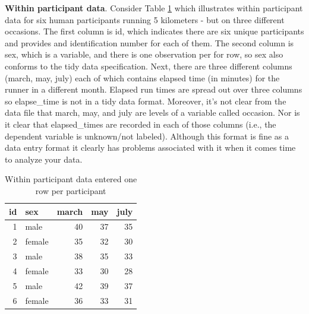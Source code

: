 \documentclass[
]{krantz}
\begin{document}
\textbf{Within participant data}. Consider Table \ref{tab:withinex} which illustrates within participant data for six human participants running 5 kilometers - but on three different occasions. The first column is id, which indicates there are six unique participants and provides and identification number for each of them. The second column is sex, which is a variable, and there is one observation per for row, so sex also conforms to the tidy data specification. Next, there are three different columns (march, may, july) each of which contains elapsed time (in minutes) for the runner in a different month. Elapsed run times are spread out over three columns so elapse\_time is not in a tidy data format. Moreover, it's not clear from the data file that march, may, and july are levels of a variable called occasion. Nor is it clear that elapsed\_times are recorded in each of those columns (i.e., the dependent variable is unknown/not labeled). Although this format is fine as a data entry format it clearly has problems associated with it when it comes time to analyze your data.

\begin{table}

\caption{\label{tab:withinex}Within participant data entered one row per participant}
\centering
\begin{tabular}[t]{rlrrr}
\toprule
id & sex & march & may & july\\
\midrule
1 & male & 40 & 37 & 35\\
2 & female & 35 & 32 & 30\\
3 & male & 38 & 35 & 33\\
4 & female & 33 & 30 & 28\\
5 & male & 42 & 39 & 37\\
6 & female & 36 & 33 & 31\\
\bottomrule
\end{tabular}
\end{table}
\end{document}
